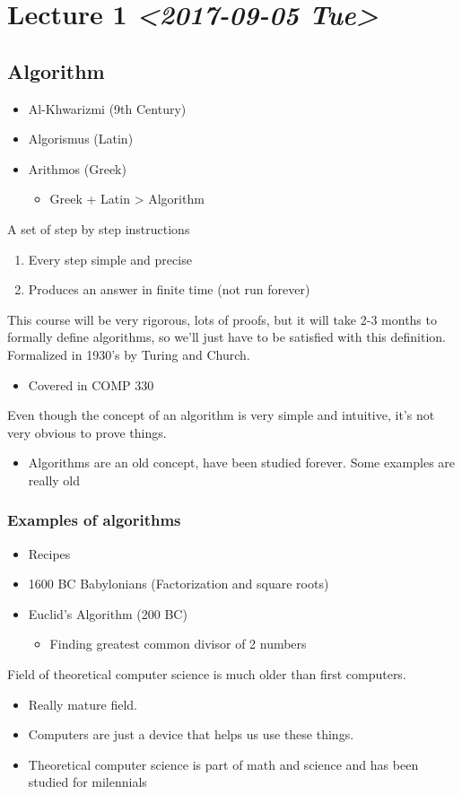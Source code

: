 \documentclass[11pt]{article}
\date{\today}
\title{}
\begin{document}
\tableofcontents

\section{Lecture 1 \textit{<2017-09-05 Tue>}}
\label{sec:org214541e}
\subsection{Algorithm}
\label{sec:org305ee78}
\begin{itemize}
\item Al-Khwarizmi (9th Century)
\item Algorismus (Latin)
\item Arithmos (Greek)
\begin{itemize}
\item Greek + Latin > Algorithm
\end{itemize}
\end{itemize}
A set of step by step instructions
\begin{enumerate}
\item Every step simple and precise
\item Produces an answer in finite time (not run forever)
\end{enumerate}
This course will be very rigorous, lots of proofs, but it will take 2-3 months to formally define algorithms, so we'll just have to be satisfied with this definition.
Formalized in 1930's by Turing and Church.
\begin{itemize}
\item Covered in COMP 330
\end{itemize}
Even though the concept of an algorithm is very simple and intuitive, it's not very obvious to prove things.
\begin{itemize}
\item Algorithms are an old concept, have been studied forever. Some examples are really old
\end{itemize}
\subsubsection{Examples of algorithms}
\label{sec:org73329b8}
\begin{itemize}
\item Recipes
\item 1600 BC Babylonians (Factorization and square roots)
\item Euclid's Algorithm (200 BC)
\begin{itemize}
\item Finding greatest common divisor of 2 numbers
\end{itemize}
\end{itemize}
Field of theoretical computer science is much older than first computers.
\begin{itemize}
\item Really mature field.
\item Computers are just a device that helps us use these things.
\item Theoretical computer science is part of math and science and has been studied for milennials
\end{itemize}
\end{document}
